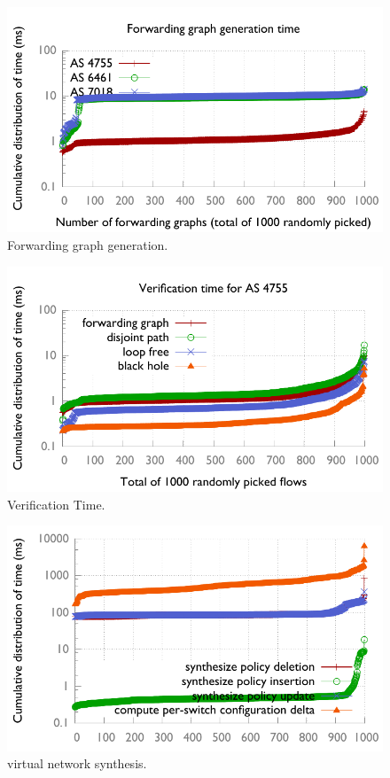 \begin{figure}
  \centering
  \includegraphics[width=1\linewidth]{figures/fg_cdf1000.pdf}
  \caption{Forwarding graph generation.}
  \label{fig:init}
\end{figure}

\begin{figure}
  \centering
  \includegraphics[width=1\linewidth]{figures/verify_cdf1000.pdf}
  \caption{Verification Time.}
  \label{fig:init}
\end{figure}

\begin{figure}
  \centering
  \includegraphics[width=1\linewidth]{figures/vn_synthesis_cdf1000.pdf}
  \caption{virtual network synthesis.}
  \label{fig:init}
\end{figure}

